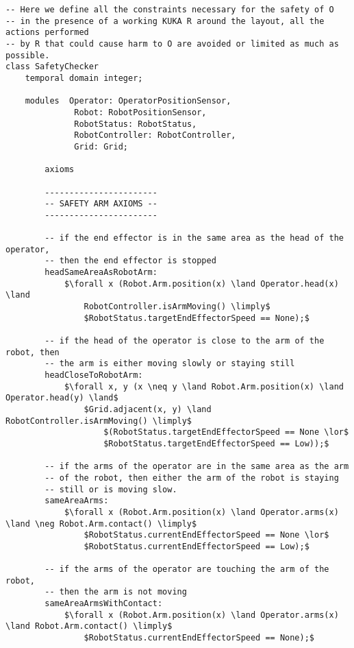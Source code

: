 \begin{lstlisting}[fontadjust, mathescape, frame=single]
-- Here we define all the constraints necessary for the safety of O 
-- in the presence of a working KUKA R around the layout, all the actions performed 
-- by R that could cause harm to O are avoided or limited as much as possible. 
class SafetyChecker
    temporal domain integer;

    modules  Operator: OperatorPositionSensor,
              Robot: RobotPositionSensor,
              RobotStatus: RobotStatus,
              RobotController: RobotController,
              Grid: Grid;
    
        axioms
    
        -----------------------
        -- SAFETY ARM AXIOMS --
        -----------------------
        
        -- if the end effector is in the same area as the head of the operator,
        -- then the end effector is stopped
        headSameAreaAsRobotArm:
            $\forall x (Robot.Arm.position(x) \land Operator.head(x) \land
                RobotController.isArmMoving() \limply$
                $RobotStatus.targetEndEffectorSpeed == None);$

        -- if the head of the operator is close to the arm of the robot, then
        -- the arm is either moving slowly or staying still
        headCloseToRobotArm:
            $\forall x, y (x \neq y \land Robot.Arm.position(x) \land Operator.head(y) \land$
                $Grid.adjacent(x, y) \land RobotController.isArmMoving() \limply$
                    $(RobotStatus.targetEndEffectorSpeed == None \lor$
                    $RobotStatus.targetEndEffectorSpeed == Low));$

        -- if the arms of the operator are in the same area as the arm
        -- of the robot, then either the arm of the robot is staying
        -- still or is moving slow.
        sameAreaArms:
            $\forall x (Robot.Arm.position(x) \land Operator.arms(x) \land \neg Robot.Arm.contact() \limply$
                $RobotStatus.currentEndEffectorSpeed == None \lor$
                $RobotStatus.currentEndEffectorSpeed == Low);$

        -- if the arms of the operator are touching the arm of the robot,
        -- then the arm is not moving
        sameAreaArmsWithContact:
            $\forall x (Robot.Arm.position(x) \land Operator.arms(x) \land Robot.Arm.contact() \limply$
                $RobotStatus.currentEndEffectorSpeed == None);$


\end{lstlisting}
